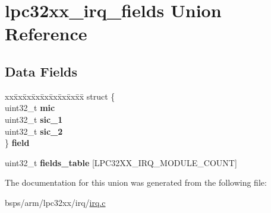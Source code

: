 \hypertarget{unionlpc32xx__irq__fields}{}\section{lpc32xx\+\_\+irq\+\_\+fields Union Reference}
\label{unionlpc32xx__irq__fields}
\subsection*{Data Fields}
\begin{DoxyCompactItemize}
\item 
\mbox{\label{unionlpc32xx__irq__fields_ae2f323435fba7375593572a94acda03e}} 
\begin{tabbing}
xx\=xx\=xx\=xx\=xx\=xx\=xx\=xx\=xx\=\kill
struct \{\\
\>uint32\_t {\bfseries mic}\\
\>uint32\_t {\bfseries sic\_1}\\
\>uint32\_t {\bfseries sic\_2}\\
\} {\bfseries field}\\

\end{tabbing}\item 
\mbox{\label{unionlpc32xx__irq__fields_a8aa157bed0faadeb5e16e971984e0b85}} 
uint32\+\_\+t {\bfseries fields\+\_\+table} \mbox{[}L\+P\+C32\+X\+X\+\_\+\+I\+R\+Q\+\_\+\+M\+O\+D\+U\+L\+E\+\_\+\+C\+O\+U\+NT\mbox{]}
\end{DoxyCompactItemize}


The documentation for this union was generated from the following file\+:\begin{DoxyCompactItemize}
\item 
bsps/arm/lpc32xx/irq/\mbox{\hyperlink{bsps_2arm_2lpc32xx_2irq_2irq_8c}{irq.\+c}}\end{DoxyCompactItemize}
